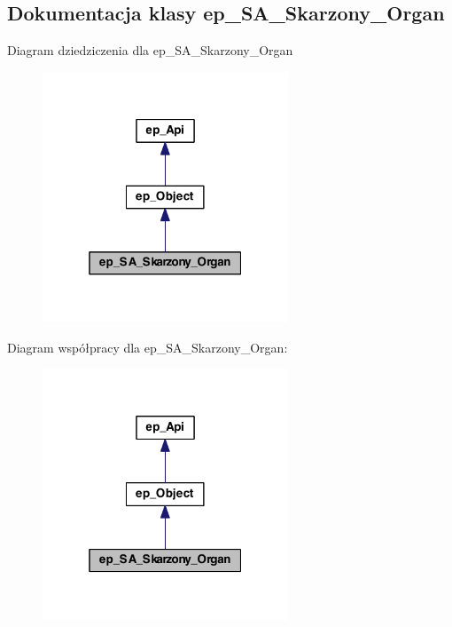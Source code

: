 \hypertarget{classep___s_a___skarzony___organ}{\subsection{Dokumentacja klasy ep\-\_\-\-S\-A\-\_\-\-Skarzony\-\_\-\-Organ}
\label{classep___s_a___skarzony___organ}
}


Diagram dziedziczenia dla ep\-\_\-\-S\-A\-\_\-\-Skarzony\-\_\-\-Organ\nopagebreak
\begin{figure}[H]
\begin{center}
\leavevmode
\includegraphics[width=208pt]{classep___s_a___skarzony___organ__inherit__graph}
\end{center}
\end{figure}


Diagram współpracy dla ep\-\_\-\-S\-A\-\_\-\-Skarzony\-\_\-\-Organ\-:\nopagebreak
\begin{figure}[H]
\begin{center}
\leavevmode
\includegraphics[width=208pt]{classep___s_a___skarzony___organ__coll__graph}
\end{center}
\end{figure}
